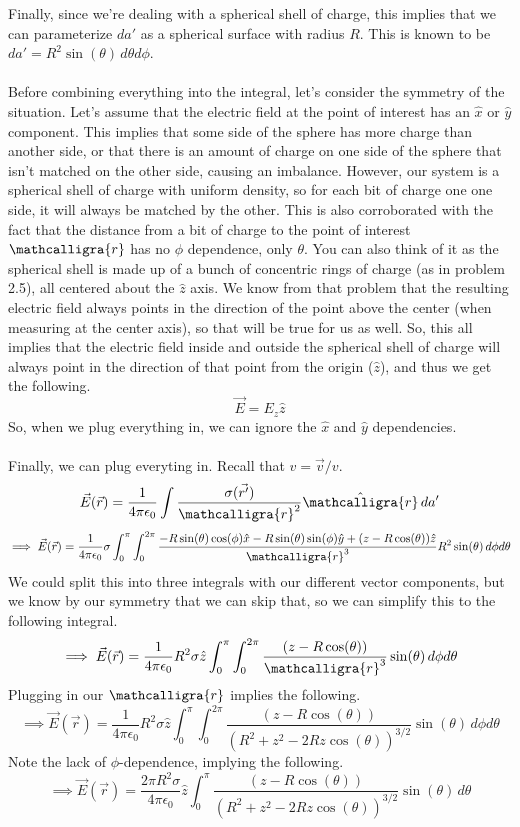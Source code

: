 \documentclass[12pt]{article}
\newcommand{\scripty}[1]{\ensuremath{\mathcalligra{#1}}}
\begin{document}
\begin{flushleft}
Finally, since we're dealing with a spherical shell of charge, this implies that we can parameterize $da'$ as a spherical surface with radius $R$.
This is known to be $da'=R^2\sin(\theta)\,d\theta d\phi$.\\~\\

Before combining everything into the integral, let's consider the symmetry of the situation.
Let's assume that the electric field at the point of interest has an $\hat{x}$ or $\hat{y}$ component.
This implies that some side of the sphere has more charge than another side, or that there is an amount of charge on one side of the sphere that isn't matched on the other side, causing an imbalance.
However, our system is a spherical shell of charge with uniform density, so for each bit of charge one one side, it will always be matched by the other.
This is also corroborated with the fact that the distance from a bit of charge to the point of interest $\scripty{r}$ has no $\phi$ dependence, only $\theta$.
You can also think of it as the spherical shell is made up of a bunch of concentric rings of charge (as in problem 2.5), all centered about the $\hat{z}$ axis.
We know from that problem that the resulting electric field always points in the direction of the point above the center (when measuring at the center axis), so that will be true for us as well.
So, this all implies that the electric field inside and outside the spherical shell of charge will always point in the direction of that point from the origin ($\hat{z}$), and thus we get the following.
$$\vec{E}=E_z\hat{z}$$
So, when we plug everything in, we can ignore the $\hat{x}$ and $\hat{y}$ dependencies.\\~\\

Finally, we can plug everyting in.
Recall that $\hat{v}=\vec{v}/v$.
$$\vec{E}(\vec{r})=\frac{1}{4\pi\epsilon_0}\int\frac{\sigma(\vec{r'})}{\scripty{r}^2}\hat{\scripty{r}}\,da'$$
$$\implies\vec{E}(\vec{r})=\frac{1}{4\pi\epsilon_0}\sigma\int_0^{\pi}\int_0^{2\pi}\frac{-R\sin(\theta)\cos(\phi)\hat{x}-R\sin(\theta)\sin(\phi)\hat{y}+(z-R\cos(\theta))\hat{z}}{\scripty{r}^3}R^2\sin(\theta)\,d\phi d\theta$$
We could split this into three integrals with our different vector components, but we know by our symmetry that we can skip that, so we can simplify this to the following integral.
$$\implies\vec{E}(\vec{r})=\frac{1}{4\pi\epsilon_0}R^2\sigma\hat{z}\int_0^{\pi}\int_0^{2\pi}\frac{(z-R\cos(\theta))}{\scripty{r}^3}\sin(\theta)\,d\phi d\theta$$
Plugging in our $\scripty{r}$ implies the following.
$$\implies\vec{E}(\vec{r})=\frac{1}{4\pi\epsilon_0}R^2\sigma\hat{z}\int_0^{\pi}\int_0^{2\pi}\frac{(z-R\cos(\theta))}{(R^2+z^2-2Rz\cos(\theta))^{3/2}}\sin(\theta)\,d\phi d\theta$$
Note the lack of $\phi$-dependence, implying the following.
$$\implies\vec{E}(\vec{r})=\frac{2\pi R^2\sigma}{4\pi\epsilon_0}\hat{z}\int_0^{\pi}\frac{(z-R\cos(\theta))}{(R^2+z^2-2Rz\cos(\theta))^{3/2}}\sin(\theta)\,d\theta$$\\~\\


\end{flushleft}
\end{document}
